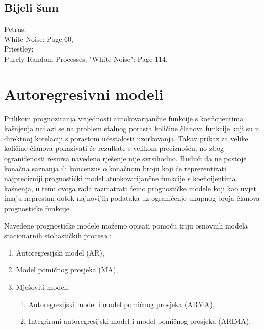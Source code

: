 \documentclass[a4paper,12pt,oneside]{memoir}
\begin{document}
    
        
        \section{Bijeli šum}
                Petrus:\\
                    White Noise: Page 60,\\

                Priestley:\\
                    Purely Random Processes; "White Noise": Page 114,\\

    \chapter{Autoregresivni modeli}
            
        Prilikom prognoziranja vrijednosti autokovarijančne funkcije s koeficijentima kašnjenja nailazi se na problem stalnog porasta količine članova funkcije koji su u direktnoj korelaciji s porastom učestalosti uzorkovanja. Takav prikaz za velike količine članova pokazivati će rezultate s velikom preciznošću, no zbog ograničenosti resursa navedeno rješenje nije svrsihodno. Budući da ne postoje konačna saznanja ili koncenzus o konačnom broju koji će reprezentirati najprecizniji prognostički model atuokovarijančne funkcije s koeficijentima kašnenja, u temi ovoga rada razmatrati ćemo prognostičke modele koji kao uvjet imaju neprestan dotok najnovijih podataka uz ograničenje ukupnog broja članova prognostičke funkcije.

        Navedene prognostičke modele možemo opisati pomoću triju osnovnih modela stacionarnih stohastičkih procesa \cite{Broersen}:
        
        \begin{enumerate}
            \item Autoregresijski model (AR),
            \item Model pomičnog prosjeka (MA),
            \item Mješoviti modeli:
            \begin{enumerate}
                \item Autoregresijski model i model pomičnog prosjeka (ARMA),
                \item Integrirani autoregresijski model i model pomičnog prosjeka (ARIMA).
            \end{enumerate}
        \end{enumerate}
        
\end{document}
